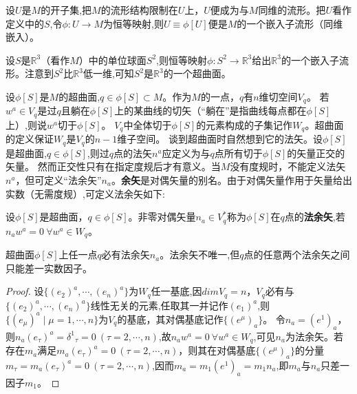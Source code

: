 \begin{example}
	设$U$是$M$的开子集,把$M$的流形结构限制在$U$上，$U$便成为与$M$同维的流形。把$U$看作定义中的$S$,令$\phi \colon U \to M$为恒等映射,则$U \equiv \phi[U]$便是$M$的一个嵌入子流形（同维嵌入）。
\end{example}

\begin{example}
	设$S$是$\mathbb{R}^3$（看作$M$）中的单位球面$S^2$,则恒等映射$\phi \colon S^2 \to \mathbb{R}^3$给出$\mathbb{R}^3$的一个嵌入子流形。注意到$S^2$比$\mathbb{R}^3$低一维,可知$S^2$是$\mathbb{R}^3$的一个超曲面。
\end{example}

设$\phi[S]$是$M$的超曲面,$q \in \phi[S] \subset M$。作为$M$的一点，$q$有$n$维切空间$V_q$。
若$w^a \in V_q$是过$q$且躺在$\phi[S]$上的某曲线的切矢（``躺在''是指曲线每点都在$\phi[S]$上）,则说$w^a$切于$\phi[S]$。
$V_q$中全体切于$\phi[S]$的元素构成的子集记作$W_q$。超曲面的定义保证$W_q$是$V_q$的$n - 1$维子空间。
谈到超曲面时自然想到它的法矢。设$\phi[S]$是超曲面,$q \in \phi[S]$,则过$q$点的法矢$n^a$应定义为与$q$点所有切于$\phi[S]$的矢量正交的矢量。
然而正交性只有在指定度规后才有意义。当$M$没有度规时，不能定义法矢$n^a$，但可定义``法余矢''$n_a$。\textbf{余矢}是对偶矢量的别名。由于对偶矢量作用于矢量给出实数（无需度规）,可定义法余矢如下:

\begin{definition}
	设$\phi[S]$是超曲面，$q \in \phi[S]$。非零对偶矢量$n_a \in V_q^*$称为$\phi[S]$在$q$点的\textbf{法余矢},若$n_aw^a = 0 ~ \forall w^a \in W_q$。
\end{definition}

\begin{theorem}
	超曲面$\phi[S]$上任一点$q$必有法余矢$n_a$。法余矢不唯一,但$q$点的任意两个法余矢之间只能差一实数因子。
\end{theorem}

\begin{proof}
	设$\{(e_2)^a, \cdots , (e_n)^a\}$为$W_q$任一基底,因$dim V_q = n$，$V_q$必有与$\{(e_2)^a, \cdots , (e_n)^a\}$线性无关的元素,任取其一并记作$(e_1)^a$,则$\{(e_\mu)^a \mid \mu = 1, \cdots, n\}$为$V_q$的基底，其对偶基底记作$\{(e^\mu)_a\}$。
	令$n_a = (e^1)_a$，则$n_a(e_\tau)^a = \delta^1{}_\tau = 0 ~ (\tau = 2, \cdots, n)$,故$n_aw^a = 0 ~ \forall w^a \in W_q$,可见$n_a$为法余矢。若存在$m_a$满足$m_a(e_\tau)^a = 0 ~ (\tau = 2, \cdots, n)$，则其在对偶基底$\{(e^\mu)_a\}$的分量$m_\tau = m_a(e_\tau)^a = 0 ~ (\tau = 2, \cdots, n)$,因而$m_a = m_1(e^1)_a = m_1n_a$,即$m_a$与$n_a$只差一因子$m_1$。
\end{proof}

